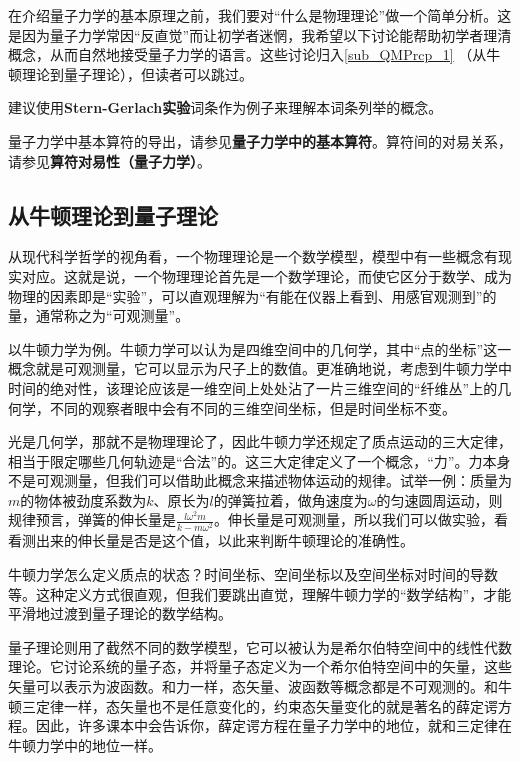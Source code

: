 

在介绍量子力学的基本原理之前，我们要对“什么是物理理论”做一个简单分析。这是因为量子力学常因“反直觉”而让初学者迷惘，我希望以下讨论能帮助初学者理清概念，从而自然地接受量子力学的语言。这些讨论归入\autoref{sub_QMPrcp_1} （从牛顿理论到量子理论），但读者可以跳过。

建议使用\textbf{Stern-Gerlach实验}词条作为例子来理解本词条列举的概念。

量子力学中基本算符的导出，请参见\textbf{量子力学中的基本算符}。算符间的对易关系，请参见\textbf{算符对易性（量子力学）}。

\subsection{从牛顿理论到量子理论}\label{sub_QMPrcp_1}

从现代科学哲学的视角看，一个物理理论是一个数学模型，模型中有一些概念有现实对应。这就是说，一个物理理论首先是一个数学理论，而使它区分于数学、成为物理的因素即是“实验”，可以直观理解为“有能在仪器上看到、用感官观测到”的量，通常称之为“可观测量”。

以牛顿力学为例。牛顿力学可以认为是四维空间中的几何学，其中“点的坐标”这一概念就是可观测量，它可以显示为尺子上的数值。更准确地说，考虑到牛顿力学中时间的绝对性，该理论应该是一维空间上处处沾了一片三维空间的“纤维丛”上的几何学，不同的观察者眼中会有不同的三维空间坐标，但是时间坐标不变。

光是几何学，那就不是物理理论了，因此牛顿力学还规定了质点运动的三大定律，相当于限定哪些几何轨迹是“合法”的。这三大定律定义了一个概念，“力”。力本身不是可观测量，但我们可以借助此概念来描述物体运动的规律。试举一例：质量为$m$的物体被劲度系数为$k$、原长为$l$的弹簧拉着，做角速度为$\omega$的匀速圆周运动，则规律预言，弹簧的伸长量是$\frac{l\omega^2m}{k-m\omega^2}$。伸长量是可观测量，所以我们可以做实验，看看测出来的伸长量是否是这个值，以此来判断牛顿理论的准确性。

牛顿力学怎么定义质点的状态？时间坐标、空间坐标以及空间坐标对时间的导数等。这种定义方式很直观，但我们要跳出直觉，理解牛顿力学的“数学结构”，才能平滑地过渡到量子理论的数学结构。

量子理论则用了截然不同的数学模型，它可以被认为是希尔伯特空间中的线性代数理论。它讨论系统的量子态，并将量子态定义为一个希尔伯特空间中的矢量，这些矢量可以表示为波函数。和力一样，态矢量、波函数等概念都是不可观测的。和牛顿三定律一样，态矢量也不是任意变化的，约束态矢量变化的就是著名的薛定谔方程。因此，许多课本中会告诉你，薛定谔方程在量子力学中的地位，就和三定律在牛顿力学中的地位一样。

